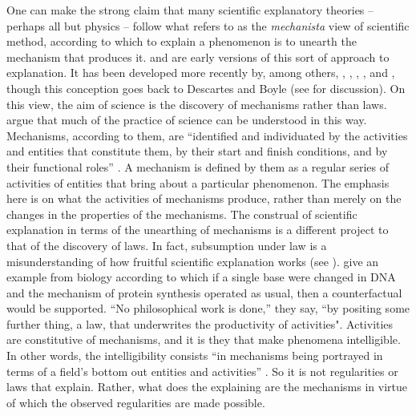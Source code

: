 One can make the strong claim that many scientific explanatory theories – perhaps all but physics – follow what \citet{Thagard2012} refers to as the \textit{mechanista} view of scientific method, according to which to explain a phenomenon is to unearth the mechanism that produces it. \citet{Fodor1968} and \citet{Cummins1975,Cummins1983} are early versions of this sort of approach to explanation. It has been developed more recently by, among others, \citet{BechtelRichardson1993}, \citet{Glennan1996}, \citet{MachamerCraver2000}, \citet{Craver2007}, and \citet{Bechtel2009}, though this conception goes back to Descartes and Boyle (see \citealt{Bechtel2011} for discussion). On this view, the aim of science is the discovery of mechanisms rather than laws. \citet{MachamerCraver2000} argue that much of the practice of science can be understood in this way. Mechanisms, according to them, are “identified and individuated by the activities and entities that constitute them, by their start and finish conditions, and by their functional roles” \citep[6]{MachamerCraver2000}. A mechanism is defined by them as a regular series of activities of entities that bring about a particular phenomenon. The emphasis here is on what the activities of mechanisms produce, rather than merely on the changes in the properties of the mechanisms. The construal of scientific explanation in terms of the unearthing of mechanisms is a different project to that of the discovery of laws. In fact, subsumption under law is a misunderstanding of how fruitful scientific explanation works (see \citealt{Cummins2000}). \citet[8]{MachamerCraver2000} give an example from biology according to which if a single base were changed in DNA and the mechanism of protein synthesis operated as usual, then a counterfactual would be supported. “No philosophical work is done,” they say, “by positing some further thing, a law, that underwrites the productivity of activities". Activities are constitutive of mechanisms, and it is they that make phenomena intelligible. In other words, the intelligibility consists “in mechanisms being portrayed in terms of a field’s bottom out entities and activities” \citep[21]{MachamerCraver2000}. So it is not regularities or laws that explain. Rather, what does the explaining are the mechanisms in virtue of which the observed regularities are made possible. 

